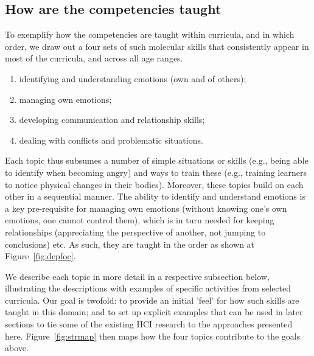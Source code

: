\documentclass[prodmode,acmtochi]{acmsmall}
\begin{document}
\subsection{How are the competencies taught}
To exemplify how the competencies are taught within curricula, and in which order, we draw out a four sets of such molecular skills that consistently appear in most of the curricula, and across all age ranges. 


\begin{enumerate}
        \item identifying and understanding emotions (own and of others);
        \item managing own emotions;
        \item developing communication and relationship skills;
        \item dealing with conflicts and problematic situations.
\end{enumerate}
 
Each topic thus subsumes a number of simple situations or skills (e.g., being able to identify when becoming angry) and ways to train these (e.g., training learners to notice physical changes in their bodies).
Moreover, these topics build on each other in a sequential manner. The ability to identify and understand emotions is a key pre-requisite for managing own emotions (without knowing one's own emotions, one cannot control them), which is in turn needed for keeping relationships (appreciating the perspective of another, not jumping to conclusions) etc. As such, they are taught in the order as shown at Figure~\ref{fig:depfoc}. 
%

We describe each topic in more detail in a respective subsection below, illustrating the descriptions with examples of specific activities from selected curricula. Our goal is twofold: to provide an initial 'feel' for how such skills are taught in this domain; and to set up explicit examples that can be used in later sections to tie some of the existing HCI research to the approaches presented here. Figure~\ref{fig:strmap} then maps how the four topics contribute to the goals above. 
\end{document}
